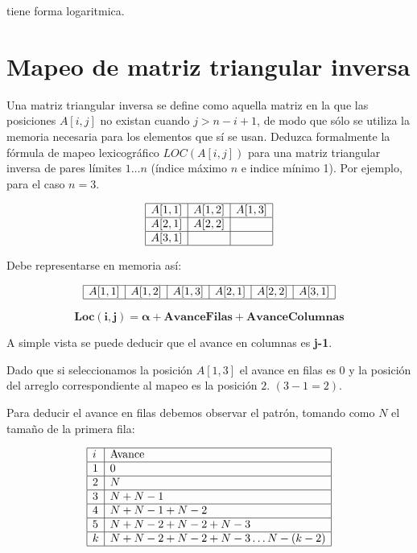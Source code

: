 tiene forma logaritmica.



\section{Mapeo de matriz triangular inversa}
\label{sec:matr-triang-inversa}

Una matriz triangular inversa se define como aquella matriz en la que
las posiciones $A[i,j]$ no existan cuando $j>n-i+1$, de modo que sólo
se utiliza la memoria necesaria para los elementos que sí se
usan. Deduzca formalmente la fórmula de mapeo lexicográfico
$LOC(A[i,j])$ para una matriz triangular inversa de pares límites $1
\ldots n$ (índice máximo $n$ e indice mínimo 1). Por ejemplo, para el
caso $n=3$.

\begin{equation*}
  \label{m-triangular-inversa}
    \begin{array}{|l|l|l|}
      \hline
      A[1,1]&A[1,2]&A[1,3]\\
      \hline
      A[2,1]&A[2,2]&\\
      \hline
      A[3,1]&&\\
      \hline
    \end{array}
\end{equation*}

Debe representarse en memoria así:

\begin{equation*}
  \begin{array}{|l|l|l|l|l|l|}
    \hline
    A[1,1]&A[1,2]&A[1,3]&A[2,1]&A[2,2]&A[3,1]\\
    \hline
  \end{array}
\end{equation*}

$$\mathbf{Loc(i, j)=\alpha+AvanceFilas+AvanceColumnas}$$

A simple vista se puede deducir que el avance en columnas es
\textbf{j-1}.

Dado que si seleccionamos la posición $A[1,3]$ el avance en filas es 0
y la posición del arreglo correspondiente al mapeo es la posición
$2$. $(3-1=2)$.

Para deducir el avance en filas debemos observar el patrón, tomando
como $N$ el tamaño de la primera fila:

\begin{equation*}
  \begin{array}{|l|l|}
    \hline
    i&\text{Avance}\\
    \hline
    1&0\\
    \hline
    2&N\\
    \hline
    3&N+N-1\\
    \hline
    4&N+N-1+N-2\\
    \hline
    5&N+N-2+N-2+N-3\\
    \hline
    k&N+N-2+N-2+N-3 \ldots N-(k-2) \\
    \hline
  \end{array}
\end{equation*}

